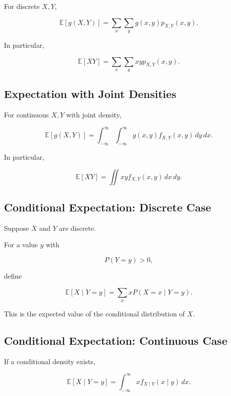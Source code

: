 For discrete \(X,Y\),

\[
\boxed{
\mathbb{E}[g(X,Y)]
=
\sum_x\sum_y
g(x,y)
p_{X,Y}(x,y).
}
\]

In particular,

\[
\boxed{
\mathbb{E}[XY]
=
\sum_x\sum_y
xy
p_{X,Y}(x,y).
}
\]

\subsection{Expectation with Joint Densities}
\label{subsec:joint-expectation-continuous}

For continuous \(X,Y\) with joint density,

\[
\boxed{
\mathbb{E}[g(X,Y)]
=
\int_{-\infty}^{\infty}
\int_{-\infty}^{\infty}
g(x,y)
f_{X,Y}(x,y)
\,dy\,dx.
}
\]

In particular,

\[
\boxed{
\mathbb{E}[XY]
=
\iint
xyf_{X,Y}(x,y)
\,dx\,dy.
}
\]

\subsection{Conditional Expectation: Discrete Case}
\label{subsec:conditional-expectation-discrete}

Suppose \(X\) and \(Y\) are discrete.

For a value \(y\) with

\[
P(Y=y)>0,
\]

define

\[
\boxed{
\mathbb{E}[X\mid Y=y]
=
\sum_x
x
P(X=x\mid Y=y).
}
\]

This is the expected value of the conditional distribution of \(X\).

\subsection{Conditional Expectation: Continuous Case}
\label{subsec:conditional-expectation-continuous}

If a conditional density exists,

\[
\boxed{
\mathbb{E}[X\mid Y=y]
=
\int_{-\infty}^{\infty}
x
f_{X\mid Y}(x\mid y)
\,dx.
}
\]

